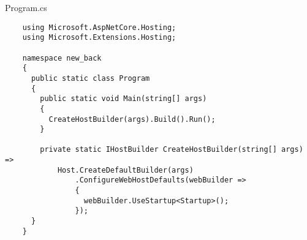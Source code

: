 
Program.cs
\lstset{style=sharpc}
\begin{lstlisting}
    using Microsoft.AspNetCore.Hosting;
    using Microsoft.Extensions.Hosting;
    
    namespace new_back
    {
      public static class Program
      {
        public static void Main(string[] args)
        {
          CreateHostBuilder(args).Build().Run();
        }
    
        private static IHostBuilder CreateHostBuilder(string[] args) =>
            Host.CreateDefaultBuilder(args)
                .ConfigureWebHostDefaults(webBuilder =>
                {
                  webBuilder.UseStartup<Startup>();
                });
      }
    }
\end{lstlisting}


